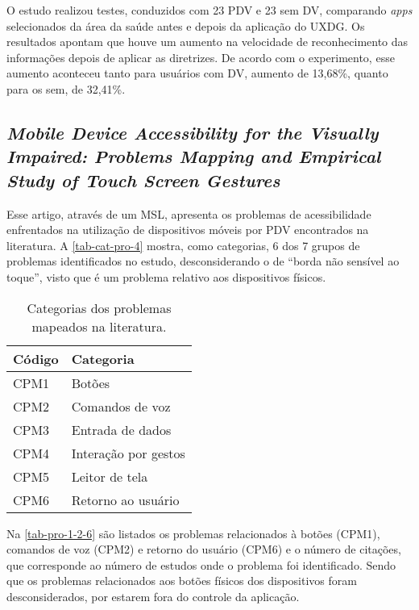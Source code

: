 O estudo realizou testes, conduzidos com 23 PDV e 23 sem DV, comparando \emph{apps} selecionados da área da saúde antes e depois da aplicação do UXDG\@.
Os resultados apontam que houve um aumento na velocidade de reconhecimento das informações depois de aplicar as diretrizes.
De acordo com o experimento, esse aumento aconteceu tanto para usuários com DV, aumento de 13,68\%, quanto para os sem, de 32,41\%.

\subsection{\emph{Mobile Device Accessibility for the Visually Impaired: Problems Mapping and Empirical Study of Touch Screen Gestures}}

Esse artigo, através de um MSL, apresenta os problemas de acessibilidade enfrentados na utilização de dispositivos móveis por PDV encontrados na literatura.
A \autoref{tab-cat-pro-4} mostra, como categorias, 6 dos 7 grupos de problemas identificados no estudo,
desconsiderando o de ``borda não sensível ao toque'', visto que é um problema relativo aos dispositivos físicos.

\begin{table}[htb]
  \begin{center}
    \ABNTEXfontereduzida
    \caption{Categorias dos problemas mapeados na literatura.}
    \label{tab-cat-pro-4}
    \begin{tabular}{p{2.0cm}|p{5.0cm}}
      \textbf{Código} & \textbf{Categoria}   \\
      \hline
      CPM1            & Botões               \\
      \hline
      CPM2            & Comandos de voz      \\
      \hline
      CPM3            & Entrada de dados     \\
      \hline
      CPM4            & Interação por gestos \\
      \hline
      CPM5            & Leitor de tela       \\
      \hline
      CPM6            & Retorno ao usuário   \\
    \end{tabular}
  \end{center}
\end{table}

Na \autoref{tab-pro-1-2-6} são listados os problemas relacionados à botões (CPM1), comandos de voz (CPM2) e retorno do usuário (CPM6) e o número de citações, que corresponde ao número de estudos onde o problema foi identificado.
Sendo que os problemas relacionados aos botões físicos dos dispositivos foram desconsiderados, por estarem fora do controle da aplicação.

